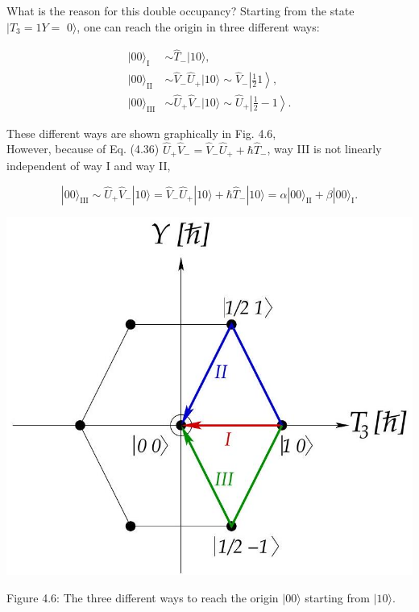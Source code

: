 \documentclass[10pt, letterpaper]{article}
\begin{document}
What is the reason for this double occupancy? Starting from the state $\mid T_{3}=1 Y=$ $0\rangle$, one can reach the origin in three different ways:

$$
\begin{aligned}
|00\rangle_{\mathrm{I}} & \sim \hat{T}_{-}|10\rangle, \\
|00\rangle_{\mathrm{II}} & \sim \hat{V}_{-} \hat{U}_{+}|10\rangle \sim \hat{V}_{-}\left|\frac{1}{2} 1\right\rangle, \\
|00\rangle_{\mathrm{III}} & \sim \hat{U}_{+} \hat{V}_{-}|10\rangle \sim \hat{U}_{+}\left|\frac{1}{2}-1\right\rangle .
\end{aligned}
$$

These different ways are shown graphically in Fig. 4.6,\\
However, because of Eq. (4.36) $\hat{U}_{+} \hat{V}_{-}=\hat{V}_{-} \hat{U}_{+}+\hbar \hat{T}_{-}$, way III is not linearly independent of way I and way II,

$$
|00\rangle_{\mathrm{III}} \sim \hat{U}_{+} \hat{V}_{-}|10\rangle=\hat{V}_{-} \hat{U}_{+}|10\rangle+\hbar \hat{T}_{-}|10\rangle=\alpha|00\rangle_{\mathrm{II}}+\beta|00\rangle_{\mathrm{I}} .
$$

\begin{center}
\includegraphics[scale=0.3]{2025_05_20_8618f55a41bfe980b4b2g-51}
\end{center}

Figure 4.6: The three different ways to reach the origin $|00\rangle$ starting from $|10\rangle$.
\end{document}
